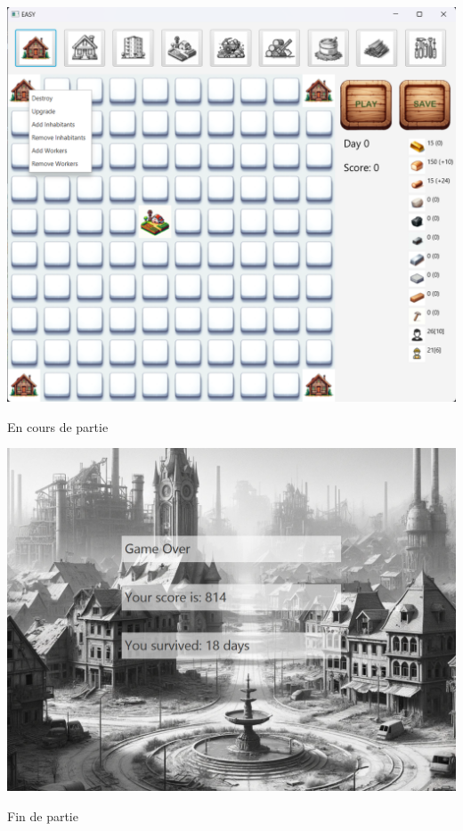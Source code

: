 \documentclass[a4paper,11pt]{article}
\begin{document}
\begin{table}[ht]
\begin{subtable}{.3\linewidth}
		\includegraphics[width=1\linewidth]{mid_game.png}
		\caption{En cours de partie}
		\label{subfig:image2}
	\end{subtable}%
	\hfill
	\begin{subtable}{.3\linewidth}
		\centering
		\includegraphics[width=1\linewidth]{game_over.png}
		\caption{Fin de partie}
		\label{subfig:image3}
	\end{subtable}
	\begin{subtable}{.3\linewidth}
		\centering

\end{subtable}
\end{table}
\end{document}
